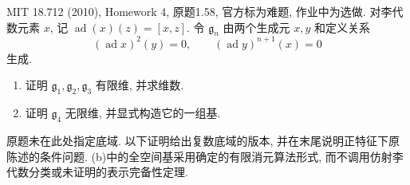 \begin{exercise}\label{hw:1.58}
MIT 18.712 (2010), Homework 4, 原题1.58, 官方标为难题, 作业中为选做. 对李代数元素 $x$, 记 $\operatorname{ad}(x)(z)=[x,z]$. 令 $\mathfrak g_n$ 由两个生成元 $x,y$ 和定义关系
\[
(\operatorname{ad}x)^2(y)=0,\qquad
(\operatorname{ad}y)^{n+1}(x)=0
\]
生成.
\begin{enumerate}[label=(\alph*)]
\item 证明 $\mathfrak g_1,\mathfrak g_2,\mathfrak g_3$ 有限维, 并求维数.
\item 证明 $\mathfrak g_4$ 无限维, 并显式构造它的一组基.
\end{enumerate}
原题未在此处指定底域. 以下证明给出复数底域的版本, 并在末尾说明正特征下原陈述的条件问题. (b)中的全空间基采用确定的有限消元算法形式, 而不调用仿射李代数分类或未证明的表示完备性定理.
\end{exercise}

